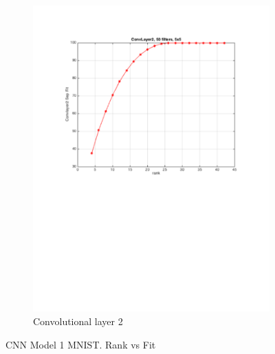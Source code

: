 \begin{figure}[h!]
\begin{subfigure}[b]{0.40\textwidth}
    \includegraphics[width=\textwidth]{images/imagesCNN_page2.pdf}
    \caption{Convolutional layer 2}
  \end{subfigure}
  \caption{CNN Model 1 MNIST. Rank vs Fit}
  \label{fig:cnn1fitness}
\end{figure}

